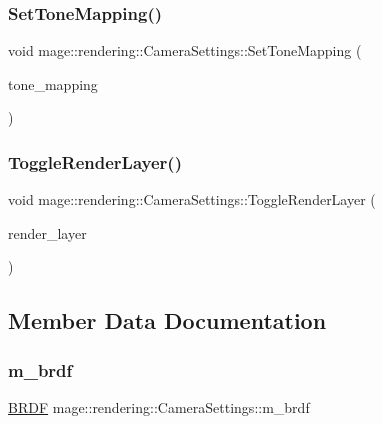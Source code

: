 \subsubsection{\texorpdfstring{Set\+Tone\+Mapping()}{SetToneMapping()}}
{\footnotesize\ttfamily void mage\+::rendering\+::\+Camera\+Settings\+::\+Set\+Tone\+Mapping (\begin{DoxyParamCaption}\item[{\hyperlink{namespacemage_1_1rendering_a789e4b7d9a8cc831b065e9c6bb7430e9}{Tone\+Mapping}}]{tone\+\_\+mapping }\end{DoxyParamCaption})\hspace{0.3cm}{\ttfamily [noexcept]}}

\hypertarget{classmage_1_1rendering_1_1_camera_settings_a95c531aba7bbddba9ea47000de3c53b2}{}\label{classmage_1_1rendering_1_1_camera_settings_a95c531aba7bbddba9ea47000de3c53b2} 
\subsubsection{\texorpdfstring{Toggle\+Render\+Layer()}{ToggleRenderLayer()}}
{\footnotesize\ttfamily void mage\+::rendering\+::\+Camera\+Settings\+::\+Toggle\+Render\+Layer (\begin{DoxyParamCaption}\item[{\hyperlink{namespacemage_1_1rendering_a466c2a441ea5b26e4625c2f34e021b3d}{Render\+Layer}}]{render\+\_\+layer }\end{DoxyParamCaption})\hspace{0.3cm}{\ttfamily [noexcept]}}



\subsection{Member Data Documentation}
\hypertarget{classmage_1_1rendering_1_1_camera_settings_a18daf9b9c8c7319e7db996a406aa0a43}{}\label{classmage_1_1rendering_1_1_camera_settings_a18daf9b9c8c7319e7db996a406aa0a43} 
\subsubsection{\texorpdfstring{m\+\_\+brdf}{m\_brdf}}
{\footnotesize\ttfamily \hyperlink{namespacemage_1_1rendering_ab8fe8684ca4bd74ba3a394b00cf125b5}{B\+R\+DF} mage\+::rendering\+::\+Camera\+Settings\+::m\+\_\+brdf\hspace{0.3cm}{\ttfamily [private]}}

